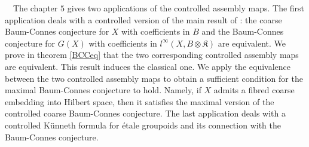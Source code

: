 \ \ The chapter $5$ gives two applications of the controlled assembly maps. The first application deals with a controlled version of the main result of \cite{SkTuYu} : the coarse Baum-Connes conjecture for $X$ with coefficients in $B$ and the Baum-Connes conjecture for $G(X)$ with coefficients in $l^\infty (X, B\otimes\mathfrak K)$ are equivalent. We prove in theorem \ref{BCCeq} that the two corresponding controlled assembly maps are equivalent. This result induces the classical one. We apply the equivalence between the two controlled assembly maps to obtain a sufficient condition for the maximal Baum-Connes conjecture to hold. Namely, if $X$ admits a fibred coarse embedding into Hilbert space, then it satisfies the maximal version of the controlled coarse Baum-Connes conjecture. The last application deals with a controlled Künneth formula for étale groupoids and its connection with the Baum-Connes conjecture.  \\  












































